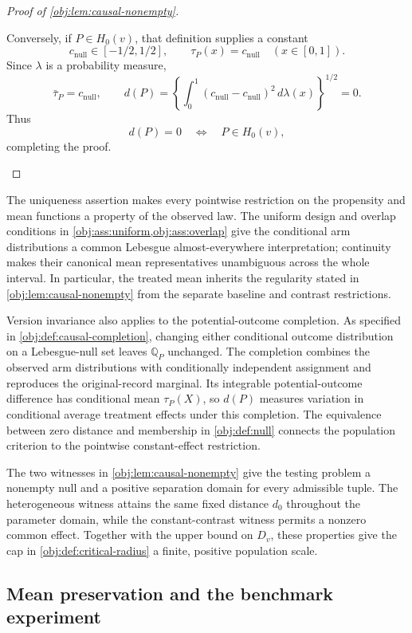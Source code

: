 \documentclass[11pt]{article}
\begin{document}
\begin{proof}[Proof of \cref{obj:lem:causal-nonempty}]
\begin{enumerate}
Conversely, if \(P\in H_0(v)\), that definition supplies a constant
\[
c_{\mathrm{null}}\in[-1/2,1/2],
\qquad
\tau_P(x)=c_{\mathrm{null}}
\quad(x\in[0,1]).
\]
Since \(\lambda\) is a probability measure,
\[
\bar\tau_P=c_{\mathrm{null}},
\qquad
d(P)
=\left\{\int_0^1(c_{\mathrm{null}}-c_{\mathrm{null}})^2
\,d\lambda(x)\right\}^{1/2}
=0.
\]
Thus
\[
d(P)=0\quad\Longleftrightarrow\quad P\in H_0(v),
\]
completing the proof.
\end{enumerate}
\end{proof}

The uniqueness assertion makes every pointwise restriction on the propensity and mean functions a property of the observed law. The uniform design and overlap conditions in \cref{obj:ass:uniform,obj:ass:overlap} give the conditional arm distributions a common Lebesgue almost-everywhere interpretation; continuity makes their canonical mean representatives unambiguous across the whole interval. In particular, the treated mean inherits the regularity stated in \cref{obj:lem:causal-nonempty} from the separate baseline and contrast restrictions.

Version invariance also applies to the potential-outcome completion. As specified in \cref{obj:def:causal-completion}, changing either conditional outcome distribution on a Lebesgue-null set leaves \(\mathbb Q_P\) unchanged. The completion combines the observed arm distributions with conditionally independent assignment and reproduces the original-record marginal. Its integrable potential-outcome difference has conditional mean \(\tau_P(X)\), so \(d(P)\) measures variation in conditional average treatment effects under this completion. The equivalence between zero distance and membership in \cref{obj:def:null} connects the population criterion to the pointwise constant-effect restriction.

The two witnesses in \cref{obj:lem:causal-nonempty} give the testing problem a nonempty null and a positive separation domain for every admissible tuple. The heterogeneous witness attains the same fixed distance \(d_0\) throughout the parameter domain, while the constant-contrast witness permits a nonzero common effect. Together with the upper bound on \(D_v\), these properties give the cap in \cref{obj:def:critical-radius} a finite, positive population scale.

\subsection{Mean preservation and the benchmark experiment}
\end{document}
